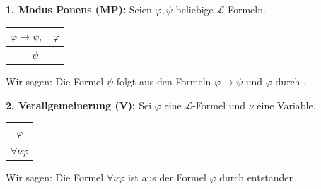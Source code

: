 \begin{math-stroke}
\textbf{1. Modus Ponens (MP):}
Seien $\varphi, \psi$ beliebige $\mathcal{L}$-Formeln.
\begin{center}
\begin{tabular}{c}
    $\varphi \rightarrow \psi, \quad \varphi$ \\ \hline
    $\psi$
\end{tabular}
\end{center}
Wir sagen: Die Formel $\psi$ folgt aus den Formeln $\varphi \rightarrow \psi$ und $\varphi$ durch .

\textbf{2. Verallgemeinerung (V):}
Sei $\varphi$ eine $\mathcal{L}$-Formel und $\nu$ eine Variable.
\begin{center}
\begin{tabular}{c}
    $\varphi$ \\ \hline
    $\forall \nu \varphi$
\end{tabular}
\end{center}
Wir sagen: Die Formel $\forall \nu \varphi$ ist aus der Formel $\varphi$ durch  entstanden.
\end{math-stroke}

